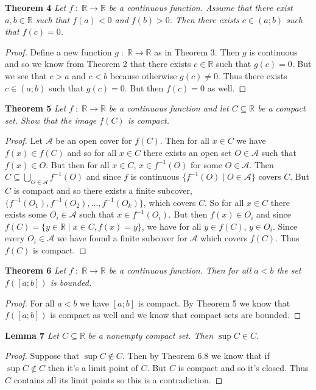 \documentclass{article}
\begin{document}
\begin{flushleft}
\textbf{Theorem 4}
\textsl{Let $f \; : \; \mathbb{R} \rightarrow \mathbb{R}$ be a continuous function. Assume that there exist $a,b \in \mathbb{R}$ such that $f(a)<0$ and $f(b)>0$. Then there exists $c \in (a;b)$ such that $f(c)=0$.}
\begin{proof}
Define a new function $g \; : \; \mathbb{R} \rightarrow \mathbb{R}$ as in Theorem 3. Then $g$ is continuous and so we know from Theorem 2 that there exists $c \in \mathbb{R}$ such that $g(c) = 0$. But we see that $c>a$ and $c<b$ because otherwise $g(c) \neq 0$. Thus there exists $c \in (a;b)$ such that $g(c)=0$. But then $f(c)=0$ as well.
\end{proof}

\textbf{Theorem 5}
\textsl{Let $f \; : \; \mathbb{R} \rightarrow \mathbb{R}$ be a continuous function and let $C \subseteq \mathbb{R}$ be a compact set. Show that the image $f(C)$ is compact.}
\begin{proof}
Let $\mathcal{A}$ be an open cover for $f(C)$. Then for all $x \in C$ we have $f(x) \in f(C)$ and so for all $x \in C$ there exists an open set $O \in \mathcal{A}$ such that $f(x) \in O$. But then for all $x \in C$, $x \in f^{-1}(O)$ for some $O \in \mathcal{A}$. Then $C \subseteq \bigcup_{O \in \mathcal{A}} f^{-1} (O)$ and since $f$ is continuous $\{f^{-1} (O) \mid O \in \mathcal{A}\}$ covers $C$. But $C$ is compact and so there exists a finite subcover, $\{f^{-1} (O_1), f^{-1} (O_2), \dots ,f^{-1}(O_k)\}$, which covers $C$. So for all $x \in C$ there exists some $O_i \in \mathcal{A}$ such that $x \in f^{-1} (O_i)$. But then $f(x) \in O_i$ and since $f(C) =\{y \in \mathbb{R} \mid x \in C, f(x)=y\}$, we have for all $y \in f(C)$, $y \in O_i$. Since every $O_i \in \mathcal{A}$ we have found a finite subcover for $\mathcal{A}$ which covers $f(C)$. Thus $f(C)$ is compact.
\end{proof}

\textbf{Theorem 6}
\textsl{Let $f \; : \; \mathbb{R} \rightarrow \mathbb{R}$ be a continuous function. Then for all $a<b$ the set $f([a;b])$ is bounded.}
\begin{proof}
For all $a<b$ we have $[a;b]$ is compact. By Theorem 5 we know that $f([a;b])$ is compact as well and we know that compact sets are bounded.
\end{proof}

\textbf{Lemma 7}
\textsl{Let $C \subseteq \mathbb{R}$ be a nonempty compact set. Then $\sup C \in C$.}
\begin{proof}
Suppose that $\sup C \notin C$. Then by Theorem 6.8 we know that if $\sup C \notin C$ then it's a limit point of $C$. But $C$ is compact and so it's closed. Thus $C$ contains all its limit points so this is a contradiction.
\end{proof}


\end{flushleft}
\end{document}
